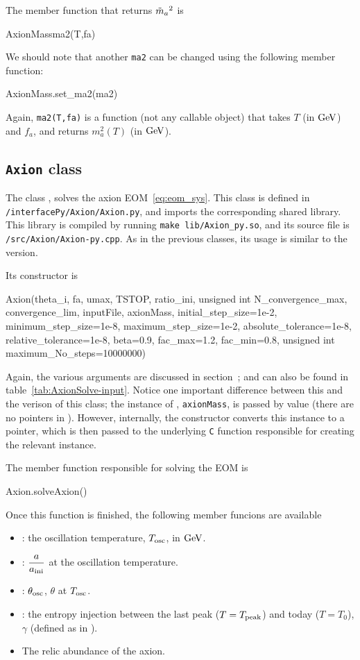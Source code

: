 \documentclass[11pt,a4paper]{article}
\begin{document}
The member function that returns $\tilde m_{a}{}^2$ is
%
\begin{py}
	AxionMassma2(T,fa)
\end{py}
%
We should note that another {\tt ma2} can be changed using the following member function:
%
\begin{py}
	AxionMass.set_ma2(ma2)
\end{py}
%
Again, {\tt ma2(T,fa)} is a function (not any callable object) that takes $T$ (in ${\rm GeV}$) and $f_a$, and returns  $m_a^2(T)$ (in ${\rm GeV}$).




\subsection{{\tt Axion} class}
%
The class , solves the axion EOM~\ref{eq:eom_sys}. This class is defined in {\tt \mimes/interfacePy/Axion/Axion.py}, and imports the corresponding shared library. This library is compiled by running {\tt make lib/Axion\_py.so}, and its source file is {\tt \mimes/src/Axion/Axion-py.cpp}. As in the previous classes, its usage is similar to the \CPP version.

Its constructor is 
%
\begin{py}
	Axion(theta_i, fa, umax, TSTOP, 
	ratio_ini, unsigned int N_convergence_max, convergence_lim, 
	inputFile, axionMass, initial_step_size=1e-2, 
	minimum_step_size=1e-8, maximum_step_size=1e-2, absolute_tolerance=1e-8, 
	relative_tolerance=1e-8, beta=0.9, fac_max=1.2, fac_min=0.8, 
	unsigned int maximum_No_steps=10000000)
\end{py}
%
Again, the various arguments are discussed in section~; and can also be found in table~\ref{tab:AxionSolve-input}. Notice one important difference between this and the \CPP verison of this class; the instance of , {\tt axionMass}, is passed by value (there are no pointers in \PY). However, internally, the constructor converts this instance to a pointer, which is then passed to the underlying {\tt C} function responsible for creating the relevant instance.
%

The member function responsible for solving the EOM is
%
\begin{py}
	Axion.solveAxion()
\end{py}
%
Once this function is finished, the following member funcions are available
\begin{itemize}
	\item {}: the oscillation temperature, $T_{\rm osc}{}$, in ${\rm GeV}$.
	\item {}: $\dfrac{a}{a_{\rm ini}{}}$ at the oscillation temperature.
	\item {}: $\theta_{\rm osc}{}$, \ie $\theta$ at $T_{\rm osc}{}$.
	\item  {}: the entropy injection between the last peak ($T=T_{\rm peak}$) and today ($T=T_0$), $\gamma$ (defined as in ).
	\item {} The relic abundance of the axion.
\end{itemize}
\end{document}
